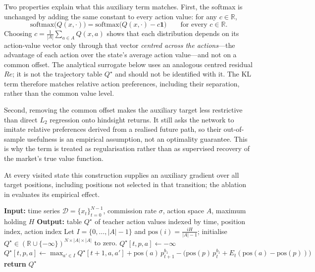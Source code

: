 Two properties explain what this auxiliary term matches. First, the softmax is unchanged by adding the same constant to every action value: for any $c\in\mathbb{R}$,
\begin{equation}
\label{eq:earnhft_softmax_shift}
\mathrm{softmax}\bigl(Q(x,\cdot)\bigr)
=\mathrm{softmax}\bigl(Q(x,\cdot)-c\mathbf{1}\bigr)
\qquad\text{for every }c\in\mathbb{R}.
\end{equation}
Choosing $c=\tfrac{1}{|A|}\sum_{a\in A}Q(x,a)$ shows that each distribution depends on its action-value vector only through that vector \emph{centred across the actions}---the advantage of each action over the state's average action value---and not on a common offset. The analytical surrogate below uses an analogous centred residual $Re$; it is not the trajectory table $Q^\star$ and should not be identified with it. The KL term therefore matches relative action preferences, including their separation, rather than the common value level.

Second, removing the common offset makes the auxiliary target less restrictive than direct $L_2$ regression onto hindsight returns. It still asks the network to imitate relative preferences derived from a realised future path, so their out-of-sample usefulness is an empirical assumption, not an optimality guarantee. This is why the term is treated as regularisation rather than as supervised recovery of the market's true value function.

At every visited state this construction supplies an auxiliary gradient over all target positions, including positions not selected in that transition; the ablation in  evaluates its empirical effect.

\begin{algorithm}[!htb]
\caption{Construction of the Hindsight Teacher Values}
\label{alg:earnhft_qtable}
\begin{algorithmic}[1]
\State \textbf{Input:} time series $\mathcal{D}=\{x_t\}_{t=0}^{N-1}$, commission rate $\sigma$, action space $A$, maximum holding $H$
\State \textbf{Output:} table $Q^\star$ of teacher action values indexed by time, position index, action index
\State Let $I=\{0,\ldots,|A|-1\}$ and $\mathrm{pos}(i)=\frac{iH}{|A|-1}$; initialise $Q^\star\in(\mathbb{R}\cup\{-\infty\})^{N\times|A|\times|A|}$ to zero.
        \State $Q^\star[t,p,a]\gets-\infty$ 
      \Else
        \State $Q^\star[t,p,a] \gets \max_{a'\in I} Q^\star[t+1,a,a'] + \mathrm{pos}(a)\,p_{t+1}^{b_1} - \bigl(\mathrm{pos}(p)\,p_{t}^{b_1} + E_t(\mathrm{pos}(a)-\mathrm{pos}(p))\bigr)$
      \EndIf
    \EndFor
  \EndFor
\EndFor
\State \textbf{return} $Q^\star$
\end{algorithmic}
\end{algorithm}

